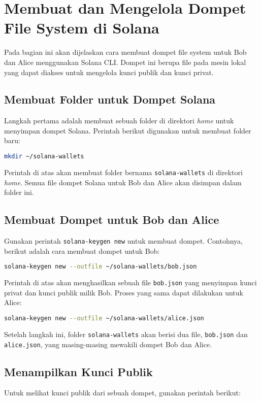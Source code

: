 \chapter{Membuat dan Mengelola Dompet File System di Solana}

Pada bagian ini akan dijelaskan cara membuat dompet file system untuk Bob dan Alice menggunakan Solana CLI. Dompet ini berupa file pada mesin lokal yang dapat diakses untuk mengelola kunci publik dan kunci privat.

\section{Membuat Folder untuk Dompet Solana}
Langkah pertama adalah membuat sebuah folder di direktori \textit{home} untuk menyimpan dompet Solana. Perintah berikut digunakan untuk membuat folder baru:

\begin{lstlisting}[language=bash]
	mkdir ~/solana-wallets
\end{lstlisting}

Perintah di atas akan membuat folder bernama \texttt{solana-wallets} di direktori \textit{home}. Semua file dompet Solana untuk Bob dan Alice akan disimpan dalam folder ini.

\section{Membuat Dompet untuk Bob dan Alice}
Gunakan perintah \texttt{solana-keygen new} untuk membuat dompet. Contohnya, berikut adalah cara membuat dompet untuk Bob:

\begin{lstlisting}[language=bash]
	solana-keygen new --outfile ~/solana-wallets/bob.json
\end{lstlisting}

Perintah di atas akan menghasilkan sebuah file \texttt{bob.json} yang menyimpan kunci privat dan kunci publik milik Bob. Proses yang sama dapat dilakukan untuk Alice:

\begin{lstlisting}[language=bash]
	solana-keygen new --outfile ~/solana-wallets/alice.json
\end{lstlisting}

Setelah langkah ini, folder \texttt{solana-wallets} akan berisi dua file, \texttt{bob.json} dan \texttt{alice.json}, yang masing-masing mewakili dompet Bob dan Alice.

\section{Menampilkan Kunci Publik}
Untuk melihat kunci publik dari sebuah dompet, gunakan perintah berikut:


